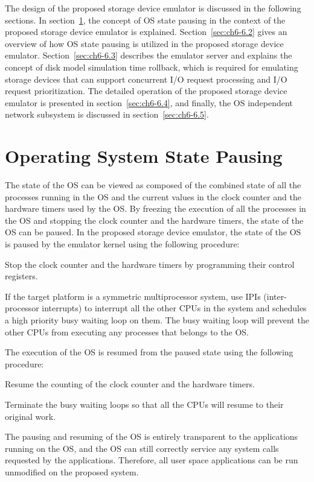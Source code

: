 The design of the proposed storage device emulator is discussed in the following sections. In section~\ref{sec:ch6-6.1}, the concept of OS state pausing in the context of the proposed storage device emulator is explained. Section~\ref{sec:ch6-6.2} gives an overview of how OS state pausing is utilized in the proposed storage device emulator. Section~\ref{sec:ch6-6.3} describes the emulator server and explains the concept of disk model simulation time rollback, which is required for emulating storage devices that can support concurrent I/O request processing and I/O request prioritization. The detailed operation of the proposed storage device emulator is presented in section~\ref{sec:ch6-6.4}, and finally, the OS independent network subsystem is discussed in section~\ref{sec:ch6-6.5}.

\section{Operating System State Pausing}
\label{sec:ch6-6.1}

The state of the OS can be viewed as composed of the combined state of all the processes running in the OS and the current values in the clock counter and the hardware timers used by the OS. By freezing the execution of all the processes in the OS and stopping the clock counter and the hardware timers, the state of the OS can be paused. In the proposed storage device emulator, the state of the OS is paused by the emulator kernel using the following procedure:
\begin{enumerate*}[label=(\roman*)]
	\item Stop the clock counter and the hardware timers by programming their control registers.
	\item If the target platform is a symmetric multiprocessor system, use IPIs (inter-processor interrupts) to interrupt all the other CPUs in the system and schedules a high priority busy waiting loop on them. The busy waiting loop will prevent the other CPUs from executing any processes that belongs to the OS.
\end{enumerate*}

The execution of the OS is resumed from the paused state using the following procedure: 
\begin{enumerate*}[label=(\roman*)]
	\item Resume the counting of the clock counter and the hardware timers.
	\item Terminate the busy waiting loops so that all the CPUs will resume to their original work.
\end{enumerate*}
The pausing and resuming of the OS is entirely transparent to the applications running on the OS, and the OS can still correctly service any system calls requested by the applications. Therefore, all user space applications can be run unmodified on the proposed system.


